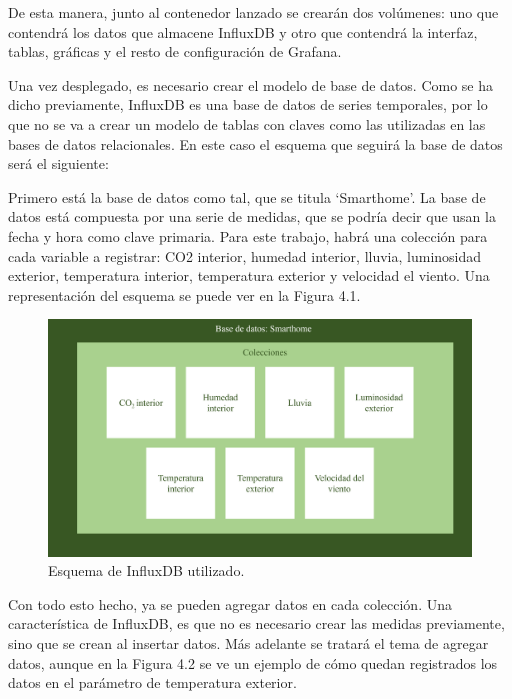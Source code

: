 De esta manera, junto al contenedor lanzado se crearán dos volúmenes: uno que contendrá los datos que almacene InfluxDB y otro que contendrá la interfaz, tablas, gráficas y el resto de configuración de Grafana.

Una vez desplegado, es necesario crear el modelo de base de datos. Como se ha dicho previamente, InfluxDB es una base de datos de series temporales, por lo que no se va a crear un modelo de tablas con claves como las utilizadas en las bases de datos relacionales. En este caso el esquema que seguirá la base de datos será el siguiente:

Primero está la base de datos como tal, que se titula ‘Smarthome’. La base de datos está compuesta por una serie de medidas, que se podría decir que usan la fecha y hora como clave primaria. Para este trabajo, habrá una colección para cada variable a registrar: CO2 interior, humedad interior, lluvia, luminosidad exterior, temperatura interior, temperatura exterior y velocidad el viento. Una representación del esquema se puede ver en la Figura 4.1.

\begin{figure}[h]
    \centering
    \includegraphics[width=17cm]{imagenes/capitulo4/esquemaBD.png}
    \caption{Esquema de InfluxDB utilizado.}
    \label{fig:esquema_influxdb}
\end{figure}

Con todo esto hecho, ya se pueden agregar datos en cada colección. Una característica de InfluxDB, es que no es necesario crear las medidas previamente, sino que se crean al insertar datos. Más adelante se tratará el tema de agregar datos, aunque en la Figura 4.2 se ve un ejemplo de cómo quedan registrados los datos en el parámetro de temperatura exterior.

